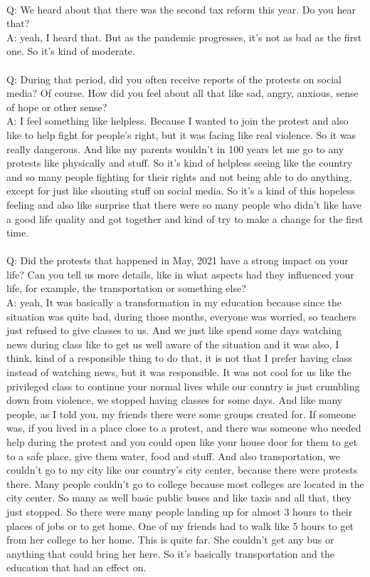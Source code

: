 \documentclass{phyasgn}\usepackage{nag}
\begin{document}
\\
Q: We heard about that there was the second tax reform this year. Do you hear that?\\
A: yeah, I heard that. But as the pandemic progresses, it's not as bad as the first one. So it's kind of moderate.\\
\\
Q: During that period, did you often receive reports of the protests on social media? Of course. How did you feel about all that like sad, angry, anxious, sense of hope or other sense?\\
A: I feel something like helpless. Because I wanted to join the protest and also like to help fight for people's right, but it was facing like real violence. So it was really dangerous. And like my parents wouldn't in 100 years let me go to any protests like physically and stuff. So it's kind of helpless seeing like the country and so many people fighting for their rights and not being able to do anything, except for just like shouting stuff on social media. So it's a kind of this hopeless feeling and also like surprise that there were so many people who didn't like have a good life quality and got together and kind of try to make a change for the first time.\\
\\
Q: Did the protests that happened in May, 2021 have a strong impact on your life? Can you tell us more details, like in what aspects had they influenced your life, for example, the transportation or something else?\\
A: yeah, It was basically a transformation in my education because since the situation was quite bad, during those months, everyone was worried, so teachers just refused to give classes to us. And we just like spend some days watching news during class like to get us well aware of the situation and it was also, I think, kind of a responsible thing to do that, it is not that I prefer having class instead of watching news, but it was responsible. It was not cool for us like the privileged class to continue your normal lives while our country is just crumbling down from violence, we stopped having classes for some days. And like many people, as I told you, my friends there were some groups created for. If someone was, if you lived in a place close to a protest, and there was someone who needed help during the protest and you could open like your house door for them to get to a safe place, give them water, food and stuff. And also transportation, we couldn't go to my city like our country's city center, because there were protests there. Many people couldn't go to college because most colleges are located in the city center. So many as well basic public buses and like taxis and all that, they just stopped. So there were many people landing up for almost 3 hours to their places of jobs or to get home. One of my friends had to walk like 5 hours to get from her college to her home. This is quite far. She couldn't get any bus or anything that could bring her here. So it's basically transportation and the education that had an effect on.\\
\end{document}
